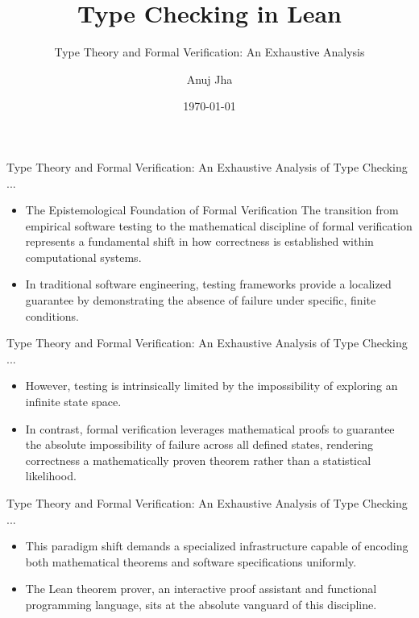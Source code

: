 \documentclass[10pt]{beamer}
\title{Type Checking in Lean}
\subtitle{Type Theory and Formal Verification: An Exhaustive Analysis}
\author{Anuj Jha}
\institute{IIT Bombay}
\date{\today}
\begin{document}
\begin{frame}
  \titlepage
\end{frame}
\begin{frame}{Type Theory and Formal Verification: An Exhaustive Analysis of Type Checking ...}
\begin{itemize}\setlength{\itemsep}{1.5em}
  \item The Epistemological Foundation of Formal Verification The transition from empirical software testing to the mathematical discipline of formal verification represents a fundamental shift in how correctness is established within computational systems.
  \item In traditional software engineering, testing frameworks provide a localized guarantee by demonstrating the absence of failure under specific, finite conditions.
\end{itemize}
\end{frame}

\begin{frame}{Type Theory and Formal Verification: An Exhaustive Analysis of Type Checking ...}
\begin{itemize}\setlength{\itemsep}{1.5em}
  \item However, testing is intrinsically limited by the impossibility of exploring an infinite state space.
  \item In contrast, formal verification leverages mathematical proofs to guarantee the absolute impossibility of failure across all defined states, rendering correctness a mathematically proven theorem rather than a statistical likelihood.
\end{itemize}
\end{frame}

\begin{frame}{Type Theory and Formal Verification: An Exhaustive Analysis of Type Checking ...}
\begin{itemize}\setlength{\itemsep}{1.5em}
  \item This paradigm shift demands a specialized infrastructure capable of encoding both mathematical theorems and software specifications uniformly.
  \item The Lean theorem prover, an interactive proof assistant and functional programming language, sits at the absolute vanguard of this discipline.
\end{itemize}
\end{frame}
\end{document}
